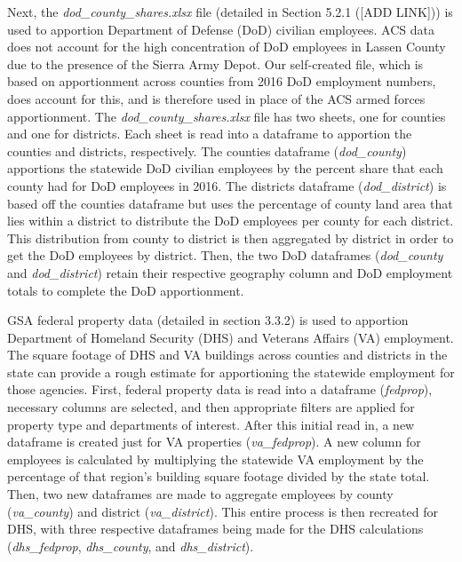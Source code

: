 \documentclass[
]{book}
\begin{document}
Next, the \emph{dod\_county\_shares.xlsx} file (detailed in Section 5.2.1 ({[}ADD LINK{]})) is used to apportion Department of Defense (DoD) civilian employees. ACS data does not account for the high concentration of DoD employees in Lassen County due to the presence of the Sierra Army Depot. Our self-created file, which is based on apportionment across counties from 2016 DoD employment numbers, does account for this, and is therefore used in place of the ACS armed forces apportionment. The \emph{dod\_county\_shares.xlsx} file has two sheets, one for counties and one for districts. Each sheet is read into a dataframe to apportion the counties and districts, respectively. The counties dataframe (\emph{dod\_county}) apportions the statewide DoD civilian employees by the percent share that each county had for DoD employees in 2016. The districts dataframe (\emph{dod\_district}) is based off the counties dataframe but uses the percentage of county land area that lies within a district to distribute the DoD employees per county for each district. This distribution from county to district is then aggregated by district in order to get the DoD employees by district. Then, the two DoD dataframes (\emph{dod\_county} and \emph{dod\_district}) retain their respective geography column and DoD employment totals to complete the DoD apportionment.

GSA federal property data (detailed in section 3.3.2) is used to apportion Department of Homeland Security (DHS) and Veterans Affairs (VA) employment. The square footage of DHS and VA buildings across counties and districts in the state can provide a rough estimate for apportioning the statewide employment for those agencies. First, federal property data is read into a dataframe (\emph{fedprop}), necessary columns are selected, and then appropriate filters are applied for property type and departments of interest. After this initial read in, a new dataframe is created just for VA properties (\emph{va\_fedprop}). A new column for employees is calculated by multiplying the statewide VA employment by the percentage of that region's building square footage divided by the state total. Then, two new dataframes are made to aggregate employees by county (\emph{va\_county}) and district (\emph{va\_district}). This entire process is then recreated for DHS, with three respective dataframes being made for the DHS calculations (\emph{dhs\_fedprop}, \emph{dhs\_county}, and \emph{dhs\_district}).
\end{document}
